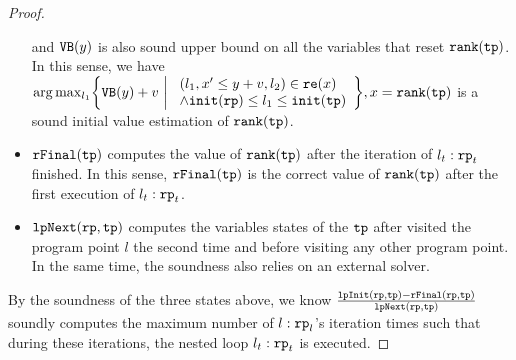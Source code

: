 \begin{proof}
\begin{itemize}
  and ${\mathtt{VB}}(y)$ is also sound upper bound on all the variables that reset $\mathtt{rank}(\mathtt{tp})$.
  \\
  In this sense, we have $\arg\max_{l_1}\left\{
    \varinvar(y) + v ~\middle\vert~ 
    \begin{array}{l} 
      (l_1, x' \leq y + v, l_2) \in \reset(x) 
      \\
      \land \absinit(\rprog) \leq l_1 \leq \absinit(\tpath)
    \end{array}
  \right\}, x = \locbound(\tpath)$
  is a sound initial value estimation of $\mathtt{rank}(\mathtt{tp})$.
  \item $\mathtt{rFinal}(\mathtt{tp})$ computes the value of $\mathtt{rank}(\mathtt{tp})$ after the iteration of $l_t:\mathtt{rp}_t$ finished.
  In this sense, $\mathtt{rFinal}(\mathtt{tp})$ is the correct value of $\mathtt{rank}(\mathtt{tp})$ after the first execution of $l_t:\mathtt{rp}_t$.
  \item  $\mathtt{lpNext}(\mathtt{rp}, \mathtt{tp})$ computes the variables states of the $\mathtt{tp}$
  after visited the program point $l$ the second time and before visiting any other program point.
  In the same time, the soundness also relies on an external solver. 
\end{itemize}
By the soundness of the three states above, we know $\frac{\mathtt{lpInit}(\mathtt{rp}, \mathtt{tp}) - \mathtt{rFinal}(\mathtt{rp}, \mathtt{tp})}{\mathtt{lpNext}(\mathtt{rp}, \mathtt{tp})}$ soundly computes the maximum number of $l: \mathtt{rp}_l$'s iteration times such that during these iterations, the nested loop $l_t: \mathtt{rp}_t$ is executed.
\end{proof}